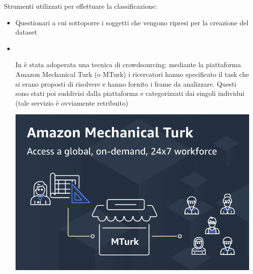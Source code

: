 Strumenti utilizzati per effettuare la classificazione:
\begin{itemize}
    \item Questionari a cui sottoporre i soggetti che vengono ripresi per la creazione del dataset
        \item \mbox{}\\[-\baselineskip]
        \begin{minipage}[t]{0.6\textwidth}
            In \cite{DAiSEE} è stata adoperata una tecnica di crowdsourcing: mediante la piattaforma Amazon Mechanical Turk (o MTurk) i ricercatori hanno specificato il task che si erano proposti di risolvere e hanno fornito i frame da analizzare. Questi sono stati poi suddivisi dalla piattaforma e categorizzati dai singoli individui (tale servizio è ovviamente retribuito)
        \end{minipage}\hfill
        \begin{minipage}[t]{0.3\textwidth}
            \centering
            \vspace{0pt}
            \includegraphics[width=\textwidth]{images/12.png}
        \end{minipage}
\end{itemize}


